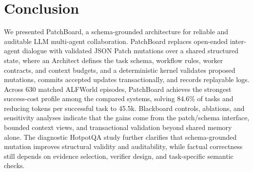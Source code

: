 \documentclass[11pt]{article}
\newcommand{\method}{PatchBoard}
\begin{document}



\section{Conclusion}

We presented \method{}, a schema-grounded architecture for reliable and auditable LLM multi-agent collaboration. \method{} replaces open-ended inter-agent dialogue with validated JSON Patch mutations over a shared structured state, where an Architect defines the task schema, workflow rules, worker contracts, and context budgets, and a deterministic kernel validates proposed mutations, commits accepted updates transactionally, and records replayable logs. Across 630 matched ALFWorld episodes, \method{} achieves the strongest success-cost profile among the compared systems, solving 84.6\% of tasks and reducing tokens per successful task to 45.5k. Blackboard controls, ablations, and sensitivity analyses indicate that the gains come from the patch/schema interface, bounded context views, and transactional validation beyond shared memory alone. The diagnostic HotpotQA study further clarifies that schema-grounded mutation improves structural validity and auditability, while factual correctness still depends on evidence selection, verifier design, and task-specific semantic checks.
\end{document}
